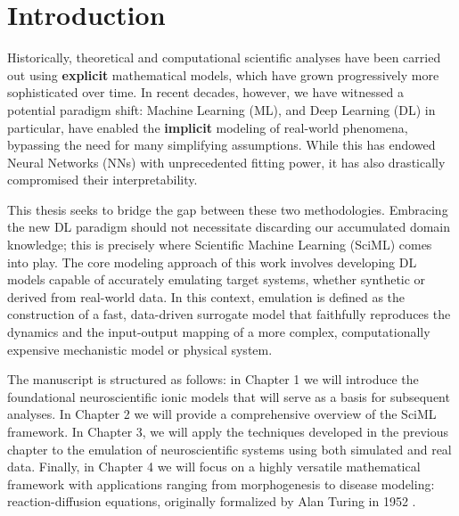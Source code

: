 
\chapter*{\label{ch:introduction}Introduction}


Historically, theoretical and computational scientific analyses have been carried out using \textbf{explicit} mathematical models, which have grown progressively more sophisticated over time. In recent decades, however, we have witnessed a potential paradigm shift: Machine Learning (ML), and Deep Learning (DL) in particular, have enabled the \textbf{implicit} modeling of real-world phenomena, bypassing the need for many simplifying assumptions. While this has endowed Neural Networks (NNs) with unprecedented fitting power, it has also drastically compromised their interpretability.

This thesis seeks to bridge the gap between these two methodologies. Embracing the new DL paradigm should not necessitate discarding our accumulated domain knowledge; this is precisely where Scientific Machine Learning (SciML) comes into play. 
\newline
The core modeling approach of this work involves developing DL models capable of accurately emulating target systems, whether synthetic or derived from real-world data.
In this context, emulation is defined as the construction of a fast, data-driven surrogate model that faithfully reproduces the dynamics and the input-output mapping of a more complex, computationally expensive mechanistic model or physical system.

The manuscript is structured as follows: in Chapter 1 we will introduce the foundational neuroscientific ionic models that will serve as a basis for subsequent analyses. In Chapter 2 we will provide a comprehensive overview of the SciML framework. In Chapter 3, we will apply the techniques developed in the previous chapter to the emulation of neuroscientific systems using both simulated and real data. Finally, in Chapter 4 we will focus on a highly versatile mathematical framework with applications ranging from morphogenesis to disease modeling: reaction-diffusion equations, originally formalized by Alan Turing in 1952 \cite{turing1952chemical}.